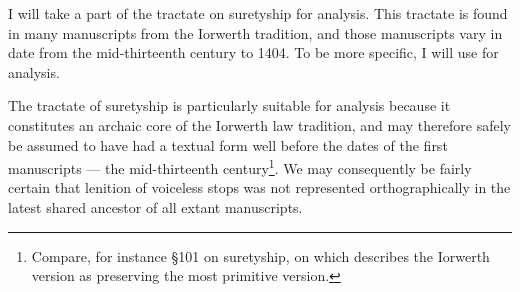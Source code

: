 


I will take a part of the tractate on suretyship for analysis.
This tractate is found in many manuscripts from the Iorwerth tradition, and those manuscripts vary in date from the mid-thirteenth century to 1404.
To be more specific, I will use \textcite[\S\S58--65]{wiliam_llyfr_1960} for analysis.

The tractate of suretyship is particularly suitable for analysis because it constitutes an archaic core of the Iorwerth law tradition, and may therefore safely be assumed to have had a textual form well before the dates of the first manuscripts --- the mid-thirteenth century\footnote{Compare, for instance \S101 on suretyship, on which \textcite[20]{stacey_archaic_1986} describes the Iorwerth version as preserving the most primitive version.}. We may consequently be fairly certain that lenition of voiceless stops was not represented orthographically in the latest shared ancestor of all extant manuscripts.

